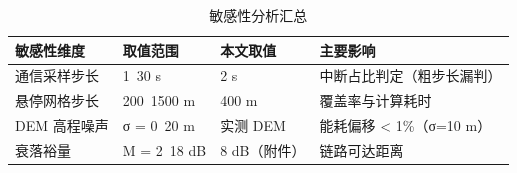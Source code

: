 \begin{table}[htbp]
\caption{敏感性分析汇总}
\label{tab:sensitivity}
\centering
{}
\setlength{\tabcolsep}{4pt}
\begin{tabular}{llll}
\toprule
敏感性维度 & 取值范围 & 本文取值 & 主要影响 \\
\midrule
通信采样步长 & 1~30 s & 2 s & 中断占比判定（粗步长漏判） \\
悬停网格步长 & 200~1500 m & 400 m & 覆盖率与计算耗时 \\
DEM 高程噪声 & σ = 0~20 m & 实测 DEM & 能耗偏移 < 1\%（σ=10 m） \\
衰落裕量 & M = 2~18 dB & 8 dB（附件） & 链路可达距离 \\
\bottomrule
\end{tabular}
\end{table}
